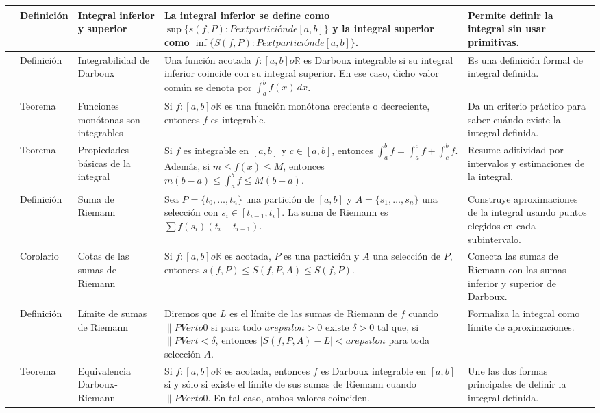 \documentclass[10pt,landscape]{article}
\begin{document}
\begin{longtable}{|>{\centering\arraybackslash}p{0.7cm}|>{\centering\arraybackslash}p{2.4cm}|p{4.2cm}|p{11.8cm}|p{7.2cm}|}
7 & Definición & Integral inferior y superior & La integral inferior se define como $\sup\{s(f,P):P	ext{ partición de }[a,b]\}$ y la integral superior como $\inf\{S(f,P):P	ext{ partición de }[a,b]\}$. & Permite definir la integral sin usar primitivas. \\ \hline
8 & Definición & Integrabilidad de Darboux & Una función acotada $f:[a,b]	o\mathbb{R}$ es Darboux integrable si su integral inferior coincide con su integral superior. En ese caso, dicho valor común se denota por $\int_a^b f(x)\,dx$. & Es una definición formal de integral definida. \\ \hline
9 & Teorema & Funciones monótonas son integrables & Si $f:[a,b]	o\mathbb{R}$ es una función monótona creciente o decreciente, entonces $f$ es integrable. & Da un criterio práctico para saber cuándo existe la integral definida. \\ \hline
10 & Teorema & Propiedades básicas de la integral & Si $f$ es integrable en $[a,b]$ y $c\in[a,b]$, entonces $\int_a^b f=\int_a^c f+\int_c^b f$. Además, si $m\leq f(x)\leq M$, entonces $m(b-a)\leq\int_a^b f\leq M(b-a)$. & Resume aditividad por intervalos y estimaciones de la integral. \\ \hline
11 & Definición & Suma de Riemann & Sea $P=\{t_0,\ldots,t_n\}$ una partición de $[a,b]$ y $A=\{s_1,\ldots,s_n\}$ una selección con $s_i\in[t_{i-1},t_i]$. La suma de Riemann es $\sum f(s_i)(t_i-t_{i-1})$. & Construye aproximaciones de la integral usando puntos elegidos en cada subintervalo. \\ \hline
12 & Corolario & Cotas de las sumas de Riemann & Si $f:[a,b]	o\mathbb{R}$ es acotada, $P$ es una partición y $A$ una selección de $P$, entonces $s(f,P)\leq S(f,P,A)\leq S(f,P)$. & Conecta las sumas de Riemann con las sumas inferior y superior de Darboux. \\ \hline
13 & Definición & Límite de sumas de Riemann & Diremos que $L$ es el límite de las sumas de Riemann de $f$ cuando $\lVert P
Vert	o0$ si para todo $arepsilon>0$ existe $\delta>0$ tal que, si $\lVert P
Vert<\delta$, entonces $|S(f,P,A)-L|<arepsilon$ para toda selección $A$. & Formaliza la integral como límite de aproximaciones. \\ \hline
14 & Teorema & Equivalencia Darboux-Riemann & Si $f:[a,b]	o\mathbb{R}$ es acotada, entonces $f$ es Darboux integrable en $[a,b]$ si y sólo si existe el límite de sus sumas de Riemann cuando $\lVert P
Vert	o0$. En tal caso, ambos valores coinciden. & Une las dos formas principales de definir la integral definida. \\ \hline

\end{longtable}
\end{document}
